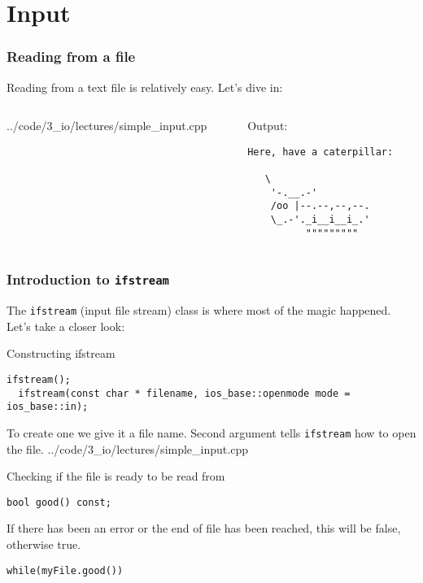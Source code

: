 \documentclass{beamer}
\begin{document}
\section{Input}

\begin{frame}[fragile]
	\frametitle{Reading from a file}
	
	Reading from a text file is relatively easy.  Let's dive in:
	\begin{columns}[t]
	  \begin{column}[T]{0.5\textwidth}
    		{../code/3_io/lectures/simple_input.cpp}
		\end{column}
		\pause
		\begin{column}[T]{0.5\textwidth}
		  Output:
			\begin{verbatim}Here, have a caterpillar:
						
   \
    '-.__.-'
    /oo |--.--,--,--.
    \_.-'._i__i__i_.'
          """""""""
		\end{verbatim}
		\end{column}
	\end{columns}
\end{frame}

\begin{frame}[fragile]
  \frametitle{Introduction to \texttt{ifstream}}
  
  The \texttt{ifstream} (input file stream) class is where most of the magic happened.  Let's take a closer look:
  \pause
  \begin{block}{Constructing ifstream}
  	\begin{lstlisting}[aboveskip=0pt]
  ifstream();
  ifstream(const char * filename, ios_base::openmode mode = ios_base::in);
		\end{lstlisting}
		To create one we give it a file name.  Second argument tells \texttt{ifstream} how to open the file.
    		{../code/3_io/lectures/simple_input.cpp}
  \end{block}
  \pause
  \begin{block}{Checking if the file is ready to be read from}
  	\begin{lstlisting}[aboveskip=0pt]
  bool good() const;
  	\end{lstlisting}
  	If there has been an error or the end of file has been reached, this will be false, otherwise true.
  	\begin{lstlisting}[belowskip=0pt]
  while(myFile.good())
  	\end{lstlisting}
  \end{block}
\end{frame}
\end{document}
